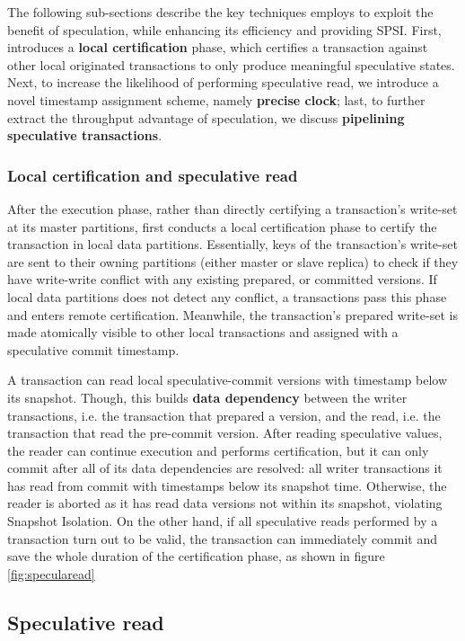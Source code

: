 The following sub-sections describe the key techniques \specula employs to exploit the benefit of speculation, while enhancing its efficiency and providing SPSI. First, \specula introduces a \textbf{local certification} phase, which certifies a transaction against other local originated transactions to only produce meaningful speculative states. Next, to increase the likelihood of performing speculative read, we introduce a novel timestamp assignment scheme, namely \textbf{precise clock}; last, to further extract the throughput advantage of speculation, we discuss \textbf{pipelining speculative transactions}.

\subsubsection{Local certification and speculative read}
After the execution phase, rather than directly certifying a transaction's write-set at its master partitions, \specula first conducts a local certification phase to certify the transaction in local data partitions. Essentially, keys of the transaction's write-set are sent to their owning partitions (either master or slave replica) to check if they have write-write conflict with any existing prepared, or committed versions. If local data partitions does not detect any conflict, a transactions pass this phase and enters remote certification. Meanwhile, the transaction's prepared write-set is made atomically visible to other local transactions and assigned with a speculative commit timestamp. 

A transaction can read local speculative-commit versions with timestamp below its snapshot. Though, this builds \textbf{data dependency} between the writer transactions, i.e. the transaction that prepared a version, and the read, i.e. the transaction that read the pre-commit version. After reading speculative values, the reader can continue execution and performs certification, but it can only commit after all of its data dependencies are resolved: all writer transactions it has read from commit with timestamps below its snapshot time. Otherwise, the reader is aborted as it has read data versions not within its snapshot, violating Snapshot Isolation. On the other hand, if all speculative reads performed by a transaction turn out to be valid, the transaction can immediately commit and save the whole duration of the certification phase, as shown in figure \ref{fig:specularead}

\iffalse
\subsection{Speculative read}
\label{sub:sr}

